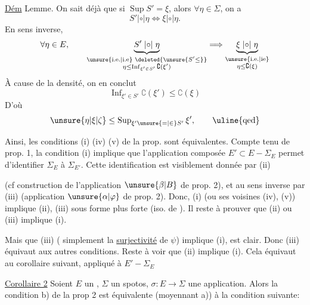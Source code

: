 \uline{Dém}  Lemme. On sait déjà que si $\operatorname{Sup}S'=\xi$, alors $\forall\eta\in\Sigma$, on a
\[
S'\mathrel{|{\circ}|}\eta\Longleftrightarrow\xi\mathrel{|{\circ}|}\eta.
\]
En sens inverse, 
\[
\forall\eta\in E,\qquad
\underbrace{S'\mathrel{|{\circ}|}\eta}_{\substack{\text{\unsure{i.e.|i.e} }\deleted{\unsure{S'\leq}}\\\eta\leq\operatorname{Inf}_{\xi'\in S'}\complement(\xi')}}
\Longrightarrow
\underbrace{\xi\mathrel{|{\circ}|}\eta}_{\substack{\text{\unsure{i.e.|ie}}\\\eta\leq\complement(\xi)}}
\]
À cause de la densité, on en conclut
\[
\operatorname{Inf}_{\xi'\in S'}\complement(\xi')\leq\complement(\xi)
\]
D'où
\[
\unsure{\eta|\xi|\zeta}\leq\operatorname{Sup}_{\xi'\unsure{=|\in}S'}\xi',\qquad\text{\uline{qed}}
\]

Ainsi, les conditions (i) (iv) (v) de la prop. sont équivalentes. Compte tenu de prop. 1, la condition (i) implique que l'application composée $E'\subset E\mathbin{-}\Sigma_E$ permet d'identifier $\Sigma_E$ à $\Sigma_{E'}$. Cette identification est visiblement donnée par (ii)


(cf construction de l'application $\unsure{\beta|B}$ de prop. 2), et au sens inverse par (iii) (application $\unsure{\alpha|\varphi}$ de prop. 2). Donc, (i) (ou ses voisines (iv), (v)) implique (ii), (iii) sous forme plus forte (iso. de ). Il reste à prouver que (ii) ou (iii) implique  (i).

Mais que (iii) ( simplement la \uline{surjectivité} de $\psi$) implique (i), est clair. Donc (iii) équivaut aux autres conditions. Reste à voir que (ii) implique (i). Cela équivaut au corollaire suivant, appliqué à $E'\mathbin{-}\Sigma_E$

\uline{Corollaire 2} Soient $E$ un , $\Sigma$ un spotos, $\sigma:E\longrightarrow\Sigma$ une application. Alors la condition b) de la prop 2 est équivalente (moyennant a)) à la condition suivante:

